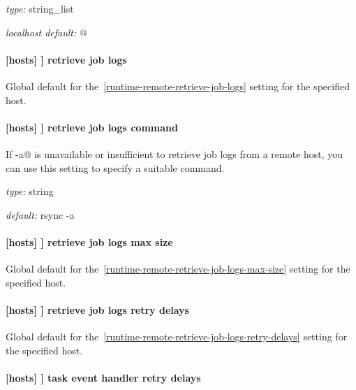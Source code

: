 \begin{myitemize}
\item {\em type:} string\_list
\item {\em localhost default:} \lstinline@[]@
\end{myitemize}

\paragraph[retrieve job logs]{[hosts] \textrightarrow [[HOST]] \textrightarrow retrieve job logs}

Global default for the~\ref{runtime-remote-retrieve-job-logs} setting for the
specified host.

\paragraph[retrieve job logs command]{[hosts] \textrightarrow [[HOST]] \textrightarrow retrieve job logs command}

If \lstinline@rsync -a@ is unavailable or insufficient to retrieve job logs
from a remote host, you can use this setting to specify a suitable command.

\begin{myitemize}
\item {\em type:} string
\item {\em default:} rsync -a
\end{myitemize}

\paragraph[retrieve job logs max size]{[hosts] \textrightarrow [[HOST]] \textrightarrow retrieve job logs max size}

Global default for the~\ref{runtime-remote-retrieve-job-logs-max-size} setting for the
specified host.

\paragraph[retrieve job logs retry delays]{[hosts] \textrightarrow [[HOST]] \textrightarrow retrieve job logs retry delays}

Global default for the~\ref{runtime-remote-retrieve-job-logs-retry-delays}
setting for the specified host.

\paragraph[task event handler retry delays]{[hosts] \textrightarrow [[HOST]] \textrightarrow task event handler retry delays}

